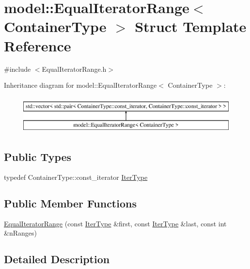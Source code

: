 \hypertarget{structmodel_1_1_equal_iterator_range}{}\section{model\+:\+:Equal\+Iterator\+Range$<$ Container\+Type $>$ Struct Template Reference}
\label{structmodel_1_1_equal_iterator_range}


{\ttfamily \#include $<$Equal\+Iterator\+Range.\+h$>$}

Inheritance diagram for model\+:\+:Equal\+Iterator\+Range$<$ Container\+Type $>$\+:\begin{figure}[H]
\begin{center}
\leavevmode
\includegraphics[height=2.000000cm]{structmodel_1_1_equal_iterator_range}
\end{center}
\end{figure}
\subsection*{Public Types}
\begin{DoxyCompactItemize}
\item 
typedef Container\+Type\+::const\+\_\+iterator \hyperlink{structmodel_1_1_equal_iterator_range_ad3dc16a10d1f0d17a3fcb43e5b98ba35}{Iter\+Type}
\end{DoxyCompactItemize}
\subsection*{Public Member Functions}
\begin{DoxyCompactItemize}
\item 
\hyperlink{structmodel_1_1_equal_iterator_range_a181ec36215d54b3a4f7044f7cc5a17f1}{Equal\+Iterator\+Range} (const \hyperlink{structmodel_1_1_equal_iterator_range_ad3dc16a10d1f0d17a3fcb43e5b98ba35}{Iter\+Type} \&first, const \hyperlink{structmodel_1_1_equal_iterator_range_ad3dc16a10d1f0d17a3fcb43e5b98ba35}{Iter\+Type} \&last, const int \&n\+Ranges)
\end{DoxyCompactItemize}


\subsection{Detailed Description}
